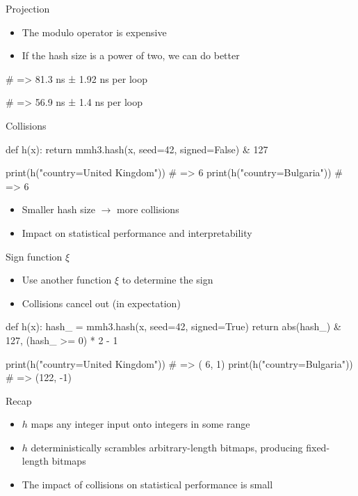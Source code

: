 \documentclass[12pt,aspectratio=169]{beamer}
\begin{document}
\begin{frame}[fragile]{Projection}
    \begin{itemize}
        \item The modulo operator is expensive
        \item If the hash size is a power of two, we can do better
    \end{itemize}
    \vfill
    \begin{py3}
        # => 81.3 ns ± 1.92 ns per loop

        # => 56.9 ns ± 1.4 ns per loop
    \end{py3}
\end{frame}

\begin{frame}[fragile]{Collisions}
    \begin{py3}
        def h(x):
            return mmh3.hash(x, seed=42, signed=False) & 127

        print(h("country=United Kingdom"))  # => 6
        print(h("country=Bulgaria"))        # => 6
    \end{py3}
    \vfill
    \begin{itemize}
        \item Smaller hash size $\to$ more collisions
        \item Impact on statistical performance and interpretability
    \end{itemize}
\end{frame}

\begin{frame}[fragile]{Sign function $\xi$}
    \begin{itemize}
        \item Use another function $\xi$ to determine the sign
        \item Collisions cancel out (in expectation)
    \end{itemize}
    \vfill
    \begin{py3}
        def h(x):
            hash_ = mmh3.hash(x, seed=42, signed=True)
            return abs(hash_) & 127, (hash_ >= 0) * 2 - 1

        print(h("country=United Kingdom"))  # => (  6,  1)
        print(h("country=Bulgaria"))        # => (122, -1)
    \end{py3}
\end{frame}

\begin{frame}{Recap}
    \begin{itemize}
        \setlength\itemsep{\bigskipamount}
        \item $h$ maps any integer input onto integers in some range
        \item $h$ deterministically scrambles arbitrary\hyp{}length bitmaps,
              producing fixed\hyp{}length bitmaps
        \item The impact of collisions on statistical performance is small
    \end{itemize}
\end{frame}
\end{document}
